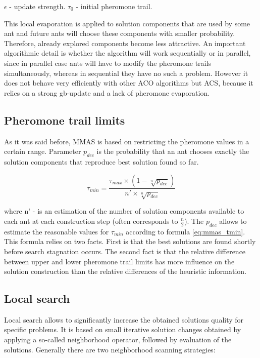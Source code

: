 \documentclass[11pt,a4paper,oneside]{book}
\begin{document}
$\epsilon$ - update strength. $\tau_0$ - initial pheromone trail.

This local evaporation is applied to solution components that are used by some ant and future ants will choose these components with smaller probability. Therefore, already explored components become less attractive. An important algorithmic detail is whether the algorithm will work sequentially or in parallel, since in parallel case ants will have to modify the pheromone trails simultaneously, whereas in sequential they have no such a problem. However it does not behave very efficiently with other ACO algorithms but ACS, because it relies on a strong gb-update and a lack of pheromone evaporation.

\subsection{Pheromone trail limits}
As it was said before, MMAS is based on restricting the pheromone values in a certain range. Parameter $p_{dec}$ is the probability that an ant chooses exactly the solution components that reproduce best solution found so far.

\begin{equation}
\tau_{min} = \frac{\tau_{max} \times (1 - \sqrt[n]{p_{dec}})}{n' \times \sqrt[n]{p_{dec}}} 
\label{eq:mmas_tmin}
\end{equation}

where n' - is an estimation of the number of solution components available to each ant at each construction step (often corresponds to $\frac{n}{2}$). The $p_{dec}$ allows to estimate the reasonable values for $\tau_{min}$ according to formula \ref{eq:mmas_tmin}. This formula relies on two facts. First is that the best solutions are found shortly before search stagnation occurs. The second fact is that the relative difference between upper and lower pheromone trail limits has more influence on the solution construction than the relative differences of the heuristic information.

\subsection{Local search}
Local search allows to significantly increase the obtained solutions quality for specific problems. It is based on small iterative solution changes obtained by applying a so-called neighborhood operator, followed by evaluation of the solutions. Generally there are two neighborhood scanning strategies:
\end{document}
